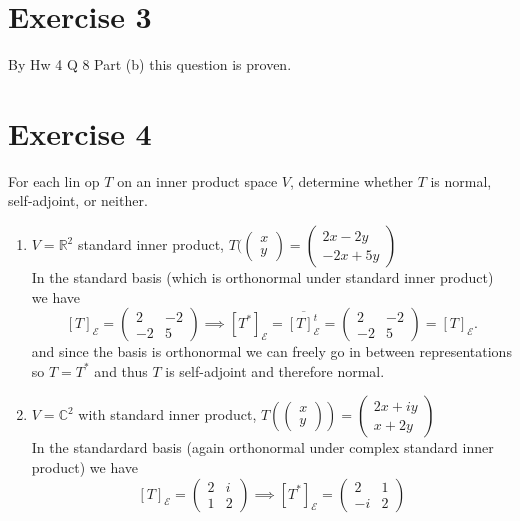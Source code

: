 \documentclass{article}
\begin{document}
    \section{Exercise 3}
    By Hw 4 Q 8 Part (b) this question is proven.

    \section{Exercise 4}
    For each lin op $T$ on an inner product space $V$, determine whether $T$ is normal,
    self-adjoint, or neither.
    \begin{enumerate}[label = (\alph*)]
        \item $V = \mathbb{R}^2$ standard inner product, $T(\begin{pmatrix} x \\y \end{pmatrix}  = \begin{pmatrix} 2x - 2y \\ -2x + 5y \end{pmatrix} $\\
            In the standard basis (which is orthonormal under standard inner product) we have
            \[
                [T]_\mathcal{E} = \begin{pmatrix} 2 & -2\\ -2 & 5 \end{pmatrix} \implies [T^{*}]_\mathcal{E} = \overline{[T]_\mathcal{E}^{t}} = \begin{pmatrix} 2 & -2 \\ -2 & 5 \end{pmatrix} = [T]_\mathcal{E}
            .\] 
                and since the basis is orthonormal we can freely go in between representations so $T = T^{*}$ and thus $T$ is self-adjoint and therefore normal.
        \item  $V = \mathbb{C}^2$ with standard inner product, $T(\begin{pmatrix} x \\ y \end{pmatrix} ) = \begin{pmatrix} 2x + iy \\ x + 2y \end{pmatrix} $ \\
            In the standardard basis (again orthonormal under complex standard inner product) we have
            \[
                [T]_\mathcal{E} = \begin{pmatrix} 2 & i \\ 1 & 2 \end{pmatrix} \implies [T^{*}]_\mathcal{E} = \begin{pmatrix} 2 & 1 \\ -i & 2 \end{pmatrix} 
\]
\end{enumerate}
\end{document}
